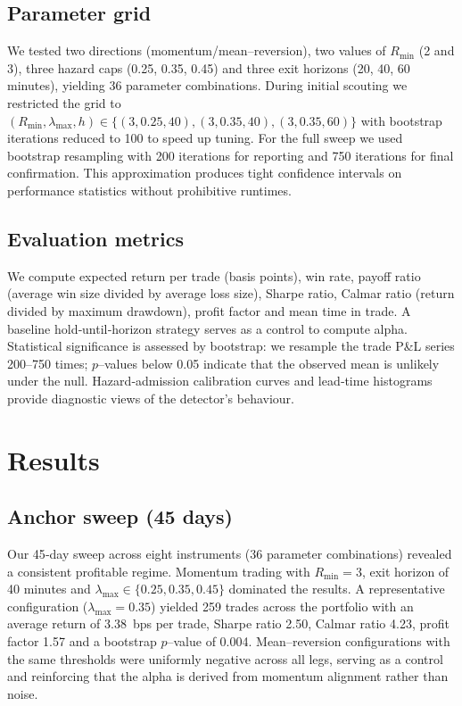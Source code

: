 \documentclass[11pt]{article}
\begin{document}
\subsection{Parameter grid}
We tested two directions (momentum/mean–reversion), two values of
$R_{\min}$ (2 and 3), three hazard caps (0.25, 0.35, 0.45) and
three exit horizons (20, 40, 60 minutes), yielding 36 parameter
combinations.  During initial scouting we restricted the grid to
$(R_{\min},\lambda_{\max},h)\in\{(3,0.25,40),(3,0.35,40),(3,0.35,60)\}$
with bootstrap iterations reduced to 100 to speed up tuning.  For
the full sweep we used bootstrap resampling with 200 iterations for
reporting and 750 iterations for final confirmation.  This
approximation produces tight confidence intervals on performance
statistics without prohibitive runtimes.

\subsection{Evaluation metrics}
We compute expected return per trade (basis points), win rate,
payoff ratio (average win size divided by average loss size), Sharpe
ratio, Calmar ratio (return divided by maximum drawdown), profit
factor and mean time in trade.  A baseline hold‐until‐horizon
strategy serves as a control to compute alpha.  Statistical
significance is assessed by bootstrap: we resample the trade P\&L
series 200–750 times; $p$–values below 0.05 indicate that the
observed mean is unlikely under the null.  Hazard‐admission
calibration curves and lead‐time histograms provide diagnostic
views of the detector’s behaviour.

\section{Results}

\subsection{Anchor sweep (45 days)}
Our 45‐day sweep across eight instruments (36 parameter
combinations) revealed a consistent profitable regime.  Momentum
trading with $R_{\min}=3$, exit horizon of 40 minutes and
$\lambda_{\max}\in\{0.25,0.35,0.45\}$ dominated the results.
A representative configuration ($\lambda_{\max}=0.35$) yielded 259
trades across the portfolio with an average return of 3.38 bps per
trade, Sharpe ratio 2.50, Calmar ratio 4.23, profit factor 1.57 and
a bootstrap $p$–value of 0.004\cite{reference_anchor}.  Mean–reversion
configurations with the same thresholds were uniformly negative
across all legs, serving as a control and reinforcing that the alpha
is derived from momentum alignment rather than noise\cite{reference_anchor}.
\end{document}
